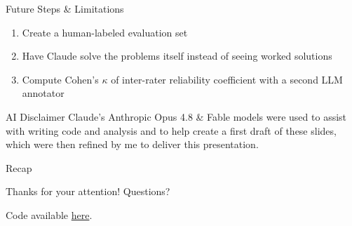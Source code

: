 \documentclass[10pt,aspectratio=169]{beamer}
\begin{document}
\begin{frame}{Future Steps \& Limitations}
\begin{enumerate} 
\item Create a human-labeled evaluation set \bigskip 
\item Have Claude solve the problems itself instead of seeing worked solutions \bigskip 
\item Compute Cohen's $\kappa$ of inter-rater reliability coefficient with a second LLM  annotator
\end{enumerate}

\end{frame} 

\begin{frame}{AI Disclaimer}
Claude's Anthropic Opus 4.8 \& Fable models were used to assist with writing code and analysis and to help create a first draft of these slides, which were then refined by me to deliver this presentation. 

\end{frame}


\begin{frame}{Recap}

\tableofcontents 
\end{frame}

\begin{frame}
  \centering
  {\Large Thanks for your attention! Questions?}

  \bigskip
  \small
  Code available \href{https://github.com/justinstevens42/SocraticMath}{here}.
\end{frame}
\end{document}
